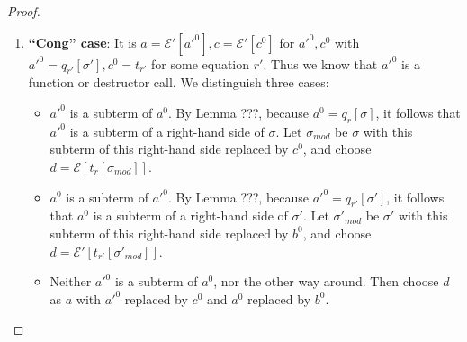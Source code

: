 \begin{proof}
\begin{enumerate}
\begin{enumerate}
\item \textbf{``Cong'' case}: It is $a = \mathcal{E}'[a'^0], c = \mathcal{E}'[c^0]$ for $a'^0, c^0$ with $a'^0 = q_{r'}[\sigma'], c^0 = t_{r'}$ for some equation $r'$. Thus we know that $a'^0$ is a function or destructor call. We distinguish three cases:
\begin{itemize}
\item $a'^0$ is a subterm of $a^0$. By Lemma ???, because $a^0 = q_r[\sigma]$, it follows that $a'^0$ is a subterm of a right-hand side of $\sigma$. Let $\sigma_{mod}$ be $\sigma$ with this subterm of this right-hand side replaced by $c^0$, and choose $d = \mathcal{E}[t_r[\sigma_{mod}]]$.

\item $a^0$ is a subterm of $a'^0$. By Lemma ???, because $a'^0 = q_{r'}[\sigma']$, it follows that $a^0$ is a subterm of a right-hand side of $\sigma'$. Let $\sigma'_{mod}$ be $\sigma'$ with this subterm of this right-hand side replaced by $b^0$, and choose $d = \mathcal{E}'[t_{r'}[\sigma'_{mod}]]$.

\item Neither $a'^0$ is a subterm of $a^0$, nor the other way around. Then choose $d$ as $a$ with $a'^0$ replaced by $c^0$ and $a^0$ replaced by $b^0$.
\end{itemize}

\end{enumerate}
\end{enumerate}

\end{proof}

